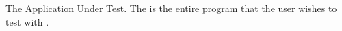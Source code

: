 \item[\gdaut] {
The Application Under Test. The \gdaut is the entire program that the user wishes to test with \gd{}.  
}